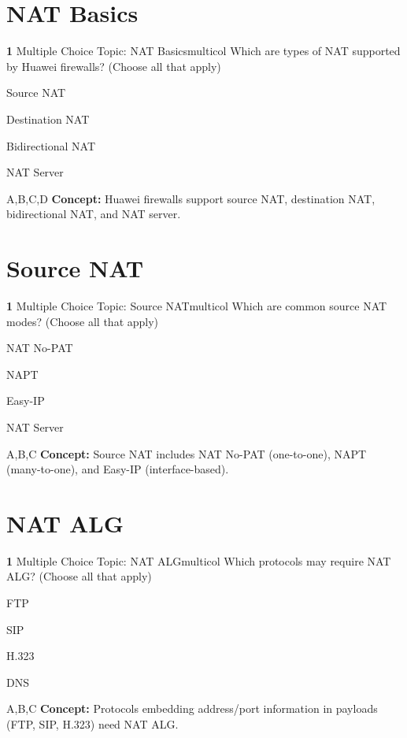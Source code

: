 \documentclass[10pt,a4paper]{article}
\begin{document}
\section{NAT Basics}
\begin{qcard}{\color{white}\textbf{1} \hfill \small Multiple Choice \textbar{} Topic: NAT Basics}{multicol}
Which are types of NAT supported by Huawei firewalls? (Choose all that apply)

\begin{qoptions}
\item Source NAT
\item Destination NAT
\item Bidirectional NAT
\item NAT Server
\end{qoptions}
\begin{explainbox}{A,B,C,D}
\textbf{Concept:} Huawei firewalls support source NAT, destination NAT, bidirectional NAT, and NAT server.
\end{explainbox}
\end{qcard}

\section{Source NAT}
\begin{qcard}{\color{white}\textbf{1} \hfill \small Multiple Choice \textbar{} Topic: Source NAT}{multicol}
Which are common source NAT modes? (Choose all that apply)

\begin{qoptions}
\item NAT No-PAT
\item NAPT
\item Easy-IP
\item NAT Server
\end{qoptions}
\begin{explainbox}{A,B,C}
\textbf{Concept:} Source NAT includes NAT No-PAT (one-to-one), NAPT (many-to-one), and Easy-IP (interface-based).
\end{explainbox}
\end{qcard}

\section{NAT ALG}
\begin{qcard}{\color{white}\textbf{1} \hfill \small Multiple Choice \textbar{} Topic: NAT ALG}{multicol}
Which protocols may require NAT ALG? (Choose all that apply)

\begin{qoptions}
\item FTP
\item SIP
\item H.323
\item DNS
\end{qoptions}
\begin{explainbox}{A,B,C}
\textbf{Concept:} Protocols embedding address/port information in payloads (FTP, SIP, H.323) need NAT ALG.
\end{explainbox}
\end{qcard}
\end{document}
